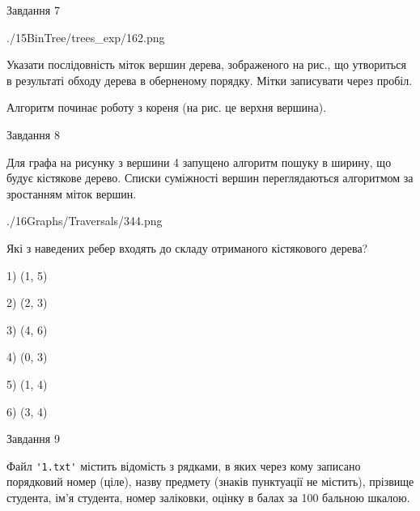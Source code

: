 \documentclass[12pt, ukrainian]{article}
\def\code#1{\Verb!#1!}
\begin{document}
{\vspace{10mm}\par

\newpage
\begin{minipage}[t]{9.7cm}
               
{\begin{center}Завдання {7}\end{center}}
\vspace{-6mm}

\begin{center}
	{./15BinTree/trees_exp/162.png}
\end{center}
Указати послідовність міток вершин дерева, зображеного на рис., що утвориться в результаті обходу дерева в оберненому порядку. Мітки записувати через пробіл.\par Алгоритм починає роботу з кореня (на рис. це верхня вершина).\par

\end{minipage}
\vline \hspace{8mm}
\begin{minipage}[t]{8.0cm}
               
{\begin{center}Завдання {8}\end{center}}
\vspace{-6mm}
Для графа на рисунку з вершини 4 запущено алгоритм пошуку в ширину, що будує кістякове дерево. Списки суміжності вершин переглядаються алгоритмом за зростанням міток вершин.\par
\begin{center}
	{./16Graphs/Traversals/344.png}
\end{center}
\par Які з наведених ребер входять до складу отриманого кістякового дерева?\par
1) (1, 5)\par
2) (2, 3)\par
3) (4, 6)\par
4) (0, 3)\par
5) (1, 4)\par
6) (3, 4)\par
{\vskip 15pt} \par

\end{minipage}

               
{\begin{center}Завдання {9}\end{center}}
\vspace{-6mm}
Файл \code{'1.txt'} містить відомість з рядками, в яких через кому записано поряд\-ковий номер (ціле), назву предмету (знаків пунктуації не містить), прізвище студента, ім'я студента, номер заліковки, оцінку в балах за 100 бальною шкалою.

}
\end{document}
